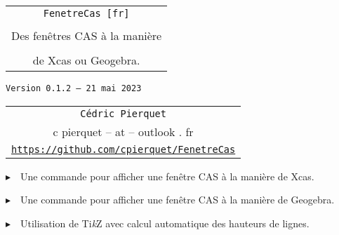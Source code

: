 \documentclass[french,a4paper,11pt]{article}
\def\TPversion{0.1.2}
\def\TPdate{21 mai 2023}
\providecommand\tikzlogo{Ti\textit{k}Z}
\let\TikZ\tikzlogo
\begin{document}
\setlength{\aweboxleftmargin}{0.07\linewidth}
\setlength{\aweboxcontentwidth}{0.93\linewidth}
\setlength{\aweboxvskip}{8pt}

\pagestyle{fancy}

\thispagestyle{empty}

\vspace{2cm}

\begin{center}
	\begin{minipage}{0.75\linewidth}
	\begin{tcolorbox}[colframe=yellow,colback=yellow!15]
		\begin{center}
			\begin{tabular}{c}
				{\Huge \texttt{FenetreCas [fr]}}\\
				\\
				{\LARGE Des fenêtres CAS à la manière} \\
				\\
				{\LARGE de Xcas ou Geogebra.} \\
			\end{tabular}
			
			\bigskip
			
			{\small \texttt{Version \TPversion{} -- \TPdate}}
		\end{center}
	\end{tcolorbox}
\end{minipage}
\end{center}

\begin{center}
	\begin{tabular}{c}
	\texttt{Cédric Pierquet}\\
	{\ttfamily c pierquet -- at -- outlook . fr}\\
	\texttt{\url{https://github.com/cpierquet/FenetreCas}}
\end{tabular}
\end{center}

\vspace{0.25cm}

{$\blacktriangleright$~~Une commande pour afficher une fenêtre CAS à la manière de \textsf{Xcas}.}

\smallskip

{$\blacktriangleright$~~Une commande pour afficher une fenêtre CAS à la manière de \textsf{Geogebra}.}

\smallskip

{$\blacktriangleright$~~Utilisation de \TikZ{} avec calcul automatique des hauteurs de lignes.}
\end{document}
